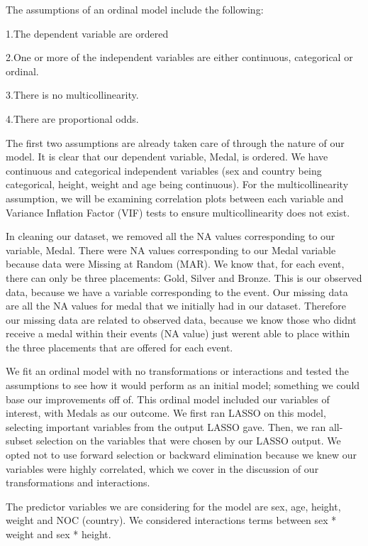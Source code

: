 \documentclass[
  letterpaper,
  DIV=11,
  numbers=noendperiod]{scrartcl}
\begin{document}
The assumptions of an ordinal model include the following:

1.The dependent variable are ordered

2.One or more of the independent variables are either continuous,
categorical or ordinal.

3.There is no multicollinearity.

4.There are proportional odds.

The first two assumptions are already taken care of through the nature
of our model. It is clear that our dependent variable, Medal, is
ordered. We have continuous and categorical independent variables (sex
and country being categorical, height, weight and age being continuous).
For the multicollinearity assumption, we will be examining correlation
plots between each variable and Variance Inflation Factor (VIF) tests to
ensure multicollinearity does not exist.~

In cleaning our dataset, we removed all the NA values corresponding to
our variable, Medal. There were NA values corresponding to our Medal
variable because data were Missing at Random (MAR). We know that, for
each event, there can only be three placements: Gold, Silver and Bronze.
This is our observed data, because we have a variable corresponding to
the event. Our missing data are all the NA values for medal that we
initially had in our dataset. Therefore our missing data are related to
observed data, because we know those who didn\textquotesingle t receive
a medal within their events (NA value) just weren\textquotesingle t able
to place within the three placements that are offered for each event.

We fit an ordinal model with no transformations or interactions and
tested the assumptions to see how it would perform as an initial model;
something we could base our improvements off of. This ordinal model
included our variables of interest, with Medals as our outcome. We first
ran LASSO on this model, selecting important variables from the output
LASSO gave. Then, we ran all-subset selection on the variables that were
chosen by our LASSO output. We opted not to use forward selection or
backward elimination because we knew our variables were highly
correlated, which we cover in the discussion of our transformations and
interactions.

\hfill\break
The predictor variables we are considering for the model are sex, age,
height, weight and NOC (country). We considered interactions terms
between sex * weight and sex * height.~
\end{document}
